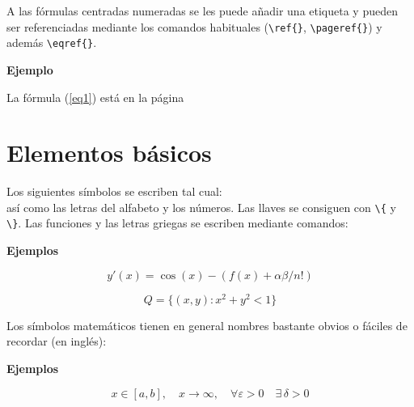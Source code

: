 \documentclass[10pt,a4paper]{report}
\begin{document}
A las fórmulas centradas numeradas se les puede añadir una etiqueta y pueden ser referenciadas
mediante los comandos habituales (\verb+\ref{}+, \verb+\pageref{}+) y además \verb+\eqref{}+.



\bigskip
\textbf{Ejemplo}

La fórmula (\ref{eq1}) está en la página \pageref{eq1}
\bigskip






\section{Elementos básicos}




Los siguientes símbolos se escriben tal cual:
\begin{equation*}
[ ( + - = / | < > : ? ! ) ]
\end{equation*}
así como las letras del alfabeto y los números. Las llaves se consiguen con \verb+\{+ y \verb+\}+.
Las funciones y las letras griegas se escriben mediante comandos:





\bigskip
\textbf{Ejemplos}

\begin{equation*}
y'(x)=\cos(x)-(f(x)+\alpha \beta /n!)
\end{equation*}

\begin{equation*}
Q=\{(x,y) : x^2+y^2<1\}
\end{equation*}

\bigskip





Los símbolos matemáticos tienen en general nombres bastante obvios o fáciles de recordar (en inglés):




\bigskip
\textbf{Ejemplos}

\begin{equation*}
x \in [a,b], \quad x \to \infty, \quad \forall \varepsilon >0 \quad \exists\, \delta >0
\end{equation*}
\end{document}

